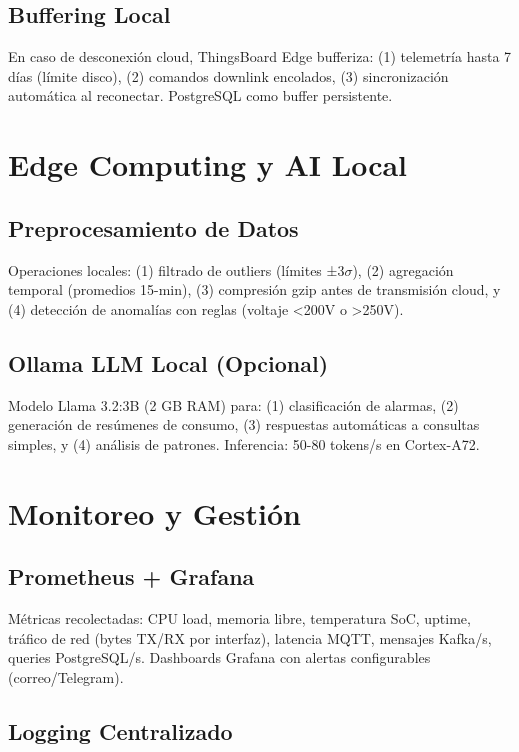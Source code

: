 \subsection{Buffering Local}

En caso de desconexión cloud, ThingsBoard Edge bufferiza: (1) telemetría hasta 7 días (límite disco), (2) comandos downlink encolados, (3) sincronización automática al reconectar. PostgreSQL como buffer persistente.

\section{Edge Computing y AI Local}

\subsection{Preprocesamiento de Datos}

Operaciones locales: (1) filtrado de outliers (límites ±3$\sigma$), (2) agregación temporal (promedios 15-min), (3) compresión gzip antes de transmisión cloud, y (4) detección de anomalías con reglas (voltaje <200V o >250V).

\subsection{Ollama LLM Local (Opcional)}

Modelo Llama 3.2:3B (2 GB RAM) para: (1) clasificación de alarmas, (2) generación de resúmenes de consumo, (3) respuestas automáticas a consultas simples, y (4) análisis de patrones. Inferencia: 50-80 tokens/s en Cortex-A72.

\section{Monitoreo y Gestión}

\subsection{Prometheus + Grafana}

Métricas recolectadas: CPU load, memoria libre, temperatura SoC, uptime, tráfico de red (bytes TX/RX por interfaz), latencia MQTT, mensajes Kafka/s, queries PostgreSQL/s. Dashboards Grafana con alertas configurables (correo/Telegram).

\subsection{Logging Centralizado}

